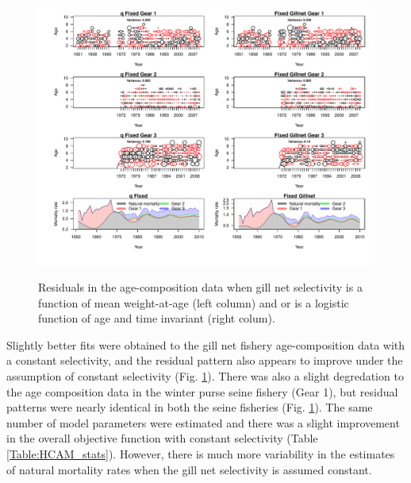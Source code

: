\begin{figure}[!tbp]
	\includegraphics[width=\textwidth]{../FIGS/iscam_fig_HCAM_Ares_qFix_GillFix.pdf}\\
	\caption{Residuals in the age-composition data when gill net selectivity is a function of mean weight-at-age (left column) and or is a logistic function of age and time invariant (right colum).}\label{fig:qFix_GillFix}
\end{figure}

Slightly better fits were obtained to the gill net fishery age-composition data with a constant selectivity, and the residual pattern also appears to improve under the assumption of constant selectivity (Fig. \ref{fig:qFix_GillFix}).  There was also a slight degredation to the age composition data in the winter purse seine fishery (Gear 1), but residual patterns were nearly identical in both the seine fisheries (Fig. \ref{fig:qFix_GillFix}).  The same number of model parameters were estimated and there was a slight improvement in the overall objective function with constant selectivity (Table \ref{Table:HCAM_stats}).  However, there is much more variability in the estimates of natural mortality rates when the gill net selectivity is assumed constant.


	
	
